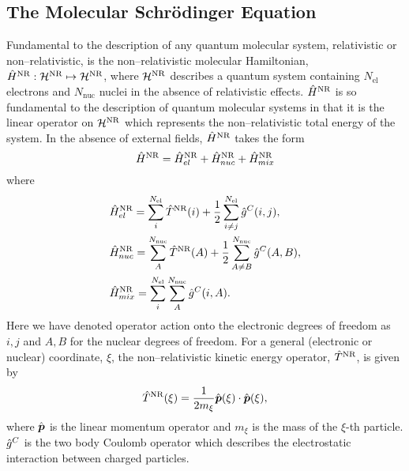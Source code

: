\subsection{The Molecular Schr\"{o}dinger Equation}
\label{sec:MolSch}

Fundamental to the description of any quantum molecular system, relativistic or non--relativistic, is the non--relativistic
molecular Hamiltonian, $\hat{H}^{\mathrm{NR}} : \mathcal{H}^{\mathrm{NR}} \mapsto \mathcal{H}^{\mathrm{NR}}$, where $\mathcal{H}^{\mathrm{NR}}$ describes a quantum
system containing $N_\mathrm{el}$ electrons and $N_\mathrm{nuc}$ nuclei in the absence of relativistic effects. 
$\hat{H}^{\mathrm{NR}}$ is so fundamental to the description
of quantum molecular systems in that it is the linear operator on $\mathcal{H}^{\mathrm{NR}}$ which represents the non--relativistic 
total energy of the system.  In the absence of external fields, $\hat{H}^{\mathrm{NR}}$ takes the form
\begin{equation}
  \label{eq:FullHNR}
  \hat{H}^{\mathrm{NR}} = \hat{H}_{el}^{\mathrm{NR}} + \hat{H}_{nuc}^{\mathrm{NR}} + \hat{H}_{mix}^{\mathrm{NR}}
\end{equation}
where 
\begin{subequations}
\begin{align}
  &\hat{H}_{el}^{\mathrm{NR}}  = \sum_i^{N_\mathrm{el}}\hat{T}^{\mathrm{NR}}(i) + \frac{1}{2}\sum_{i \neq j}^{N_\mathrm{el}} \hat{g}^C(i,j),\\ 
  &\hat{H}_{nuc}^{\mathrm{NR}} = \sum_A^{N_\mathrm{nuc}}\hat{T}^{\mathrm{NR}}(A) + \frac{1}{2}\sum_{A \neq B}^{N_\mathrm{nuc}} \hat{g}^C(A,B),\\ 
  &\hat{H}^{\mathrm{NR}}_{mix} = \sum_i^{N_\mathrm{el}} \sum_A^{N_\mathrm{nuc}} \hat{g}^C(i,A).
\end{align}
\end{subequations}
Here we have denoted operator action onto the electronic degrees of freedom as $i,j$ and $A,B$ for the nuclear degrees of
freedom. For a general (electronic or nuclear) coordinate, $\xi$, the non--relativistic kinetic energy operator, 
$\hat{T}^{\mathrm{NR}}$, is given by
\begin{align}
  \hat{T}^{\mathrm{NR}}(\xi) = \frac{1}{2m_\xi} \hat{\boldsymbol{p}}(\xi) \cdot \hat{\boldsymbol{p}}(\xi),
\end{align}
where $\hat{\boldsymbol{p}}$ is the linear momentum operator and $m_\xi$ is the mass of the $\xi$-th particle.
$\hat{g}^C$ is the two body Coulomb operator which describes the electrostatic interaction between charged particles.

